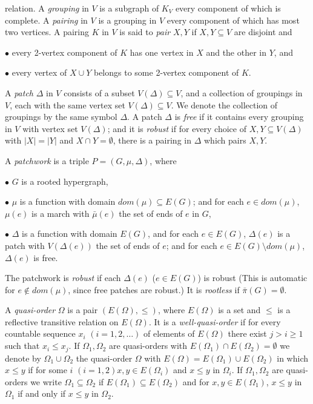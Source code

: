 \noindent relation. A \textit{grouping} in $V$ is a subgraph of $K_V$ every component of which is complete. A \textit{pairing} in $V$ is a grouping in $V$ every component of which has most two vertices. A pairing $K$ in $V$ is said to \textit{pair} $X, Y$ if $X, Y \subseteq V$ are disjoint and

\hspace*{12pt}$\bullet$ every 2-vertex component of $K$ has one vertex in $X$ and the other in $Y$, and

\hspace*{12pt}$\bullet$ every vertex of $X \cup Y$ belongs to some 2-vertex component of $K$.

A \textit{patch} $\Delta$ in $V$ consists of a subset $V(\Delta) \subseteq V$, and a collection of groupings in $V$, each with the same vertex set $V(\Delta) \subseteq V$. We denote the collection of groupings by the same symbol $\Delta$. A patch $\Delta$ is \textit{free} if it contains every grouping in $V$ with vertex set $V(\Delta)$; and it is \textit{robust} if for every choice of $X, Y \subseteq V(\Delta)$ with $|X| = |Y|$ and $X \cap Y = \emptyset$, there is a pairing in $\Delta$ which pairs $X, Y$.

A \textit{patchwork} is a triple $P = (G, \mu, \Delta)$, where

\hspace*{12pt}$\bullet$ $G$ is a rooted hypergraph,

\hspace*{12pt}$\bullet$ $\mu$ is a function with domain $dom(\mu) \subseteq E(G)$; and for each $e \in dom(\mu)$, $\mu(e)$ is a march with $\bar{\mu}(e)$ the set of ends of $e$ in $G$,

\hspace*{12pt}$\bullet$ $\Delta$ is a function with domain $E(G)$, and for each $e \in E(G)$, $\Delta(e)$ is a patch with $V(\Delta(e))$ the set of ends of $e$; and for each $e \in E(G) \setminus dom(\mu)$, $\Delta(e)$ is free.

The patchwork is \textit{robust} if each $\Delta(e)$ ($e \in E(G)$) is robust (This is automatic for $e \notin dom(\mu)$, since free patches are robust.) It is \textit{rootless} if $\bar{\pi}(G) = \emptyset$.

A \textit{quasi-order} $\Omega$ is a pair $(E(\Omega), \le)$, where $E(\Omega)$ is a set and $\le$ is a reflective transitive relation on $E(\Omega)$. It is a \textit{well-quasi-order} if for every countable sequence $x_i$ $(i = 1, 2, \ldots)$ of elements of $E(\Omega)$ there exist $j > i \ge 1$ such that $x_i \le x_j$. If $\Omega_1, \Omega_2$ are quasi-orders with $E(\Omega_1) \cap E(\Omega_2) = \emptyset$ we denote by $\Omega_1 \cup \Omega_2$ the quasi-order $\Omega$ with $E(\Omega) = E(\Omega_1) \cup E(\Omega_2)$ in which $x \le y$ if for some $i$ $(i = 1, 2) x, y \in E(\Omega_i)$ and $x \le y$ in $\Omega_i$. If $\Omega_1, \Omega_2$ are quasi-orders we write $\Omega_1 \subseteq \Omega_2$ if $E(\Omega_1) \subseteq E(\Omega_2)$ and for $x, y \in E(\Omega_1)$, $x \le y$ in $\Omega_1$ if and only if $x \le y$ in $\Omega_2$.

